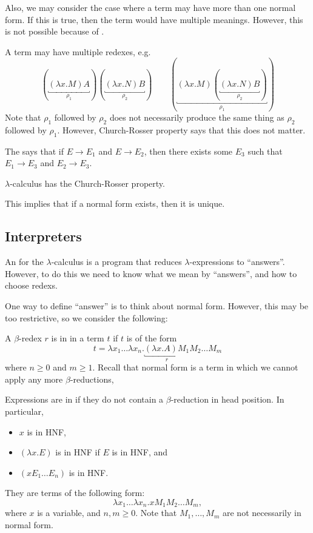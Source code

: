 \documentclass[class=scrartcl]{standalone}
\begin{document}
Also, we may consider the case where a term may have more than one normal form.
If this is true, then the term would have multiple meanings.
However, this is not possible because of .

A term may have multiple redexes, e.g.\
\[
  (\underbracket{(\lambda x. M) A}_{\rho_1})
    (\underbracket{(\lambda x. N) B}_{\rho_2}) \qquad
  (\underbracket{(\lambda x. M)
    (\underbracket{(\lambda x. N) B}_{\rho_2})}_{\rho_1})
\]
Note that \(\rho_1\) followed by \(\rho_2\) does not necessarily
produce the same thing as \(\rho_2\) followed by \(\rho_1\).
However, Church-Rosser property says that this does not matter.
\begin{definition}
  The  says that if
    \(E \to E_1\) and \(E \to E_2\),
  then there exists some \(E_3\) such that
    \(E_1 \to E_3\) and \(E_2 \to E_3\).
\end{definition}

\begin{theorem}
  \(\lambda\)-calculus has the Church-Rosser property.
\end{theorem}

This implies that if a normal form exists, then it is unique.


\subsection{Interpreters}
An  for the \(\lambda\)-calculus is a program
that reduces \(\lambda\)-expressions to ``answers''.
However, to do this we need to know
  what we mean by ``answers'', and
  how to choose redexs.

One way to define ``answer'' is to think about normal form.
However, this may be too restrictive, so we consider the following:

\begin{definition}
  A \(\beta\)-redex \(r\) is in  in a term \(t\)
  if \(t\) is of the form
  \[
    t = \lambda x_1 \dots \lambda x_n.
          \underbracket{(\lambda x. A) M_1}_r M_2 \dots M_m
  \]
  where \(n \geq 0\) and \(m \geq 1\).
  Recall that normal form is a term in which
  we cannot apply any more \(\beta\)-reductions,
\end{definition}

\begin{definition}
  Expressions are in 
  if they do not contain a \(\beta\)-reduction in head position.
  In particular,
  \begin{itemize}[nosep]
    \item \(x\) is in HNF,
    \item \((\lambda x. E)\) is in HNF if \(E\) is in HNF, and
    \item \((x E_1 \dots E_n)\) is in HNF.\@
  \end{itemize}
  They are terms of the following form:
  \[
    \lambda x_1 \dots \lambda x_n. x M_1 M_2 \dots M_m,
  \]
  where \(x\) is a variable, and \(n, m \geq 0\).
  Note that \(M_1, \dots, M_m\) are not necessarily in normal form.
\end{definition}
\end{document}
